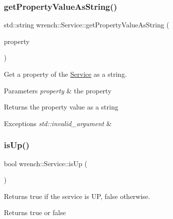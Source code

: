 \subsubsection{\texorpdfstring{get\+Property\+Value\+As\+String()}{getPropertyValueAsString()}}
{\footnotesize\ttfamily std\+::string wrench\+::\+Service\+::get\+Property\+Value\+As\+String (\begin{DoxyParamCaption}\item[{std\+::string}]{property }\end{DoxyParamCaption})}



Get a property of the \hyperlink{classwrench_1_1_service}{Service} as a string. 


\begin{DoxyParams}{Parameters}
{\em property} & the property \\
\hline
\end{DoxyParams}
\begin{DoxyReturn}{Returns}
the property value as a string
\end{DoxyReturn}

\begin{DoxyExceptions}{Exceptions}
{\em std\+::invalid\+\_\+argument} & \\
\hline
\end{DoxyExceptions}
\mbox{\label{classwrench_1_1_service_a2549b97c1454e075ebadbb38563763e0}} 
\subsubsection{\texorpdfstring{is\+Up()}{isUp()}}
{\footnotesize\ttfamily bool wrench\+::\+Service\+::is\+Up (\begin{DoxyParamCaption}{ }\end{DoxyParamCaption})}



Returns true if the service is UP, false otherwise. 

\begin{DoxyReturn}{Returns}
true or false 
\end{DoxyReturn}
\mbox{\label{classwrench_1_1_service_a573315b3c2f328e1e26cd74371140f4a}} 
